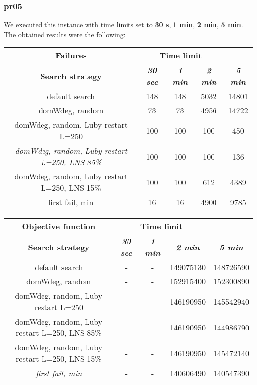 \subsubsection{pr05}
We executed this instance with time limits set to \textbf{30 s}, \textbf{1 min}, \textbf{2 min}, \textbf{5 min}.\\
The obtained results were the following:
{
\renewcommand{\arraystretch}{2}
\begin{longtable}[h]{| c | c | c | c | c |}
    \hline
    \textbf{Failures} & \multicolumn{3}{c}{Time limit} & \\
    \hline
    \textbf{Search strategy} & \textbf{\textit{30 sec}} & \textbf{\textit{1 min}} & \textbf{\textit{2 min}} & \textbf{\textit{5 min}} \\
    \hline
    \endhead
    default search                                         & 148 &  148 &  5032 &  14801 \\
    \hline
    domWdeg, random                                        &  73 &   73 &  4956 &  14722 \\
    \hline
    domWdeg, random, Luby restart L=250                    & 100 &  100 &   100 &    450 \\
    \hline
    \textit{domWdeg, random, Luby restart L=250, LNS 85\%} & 100 &  100 &   100 &    136 \\
    \hline
    domWdeg, random, Luby restart L=250, LNS 15\%          & 100 &  100 &   612 &   4389 \\
    \hline
    first fail, min                                        &  16 &   16 &  4900 &   9785 \\
    \hline
\end{longtable}
}

{
\renewcommand{\arraystretch}{2}
\begin{longtable}[h]{| c | c | c | c | c |}
    \hline
    \textbf{Objective function} & \multicolumn{3}{c}{Time limit} & \\
    \hline
    \textbf{Search strategy} & \textbf{\textit{30 sec}} & \textbf{\textit{1 min}} & \textbf{\textit{2 min}} & \textbf{\textit{5 min}} \\
    \hline
    \endhead
    default search                                        & - & - & 149075130 & 148726590 \\
    \hline
    domWdeg, random                                       & - & - & 152915400 & 152300890 \\
    \hline
    domWdeg, random, Luby restart L=250                   & - & - & 146190950 & 145542940 \\
    \hline
    domWdeg, random, Luby restart L=250, LNS 85\%         & - & - & 146190950 & 144986790 \\
    \hline
    domWdeg, random, Luby restart L=250, LNS 15\%         & - & - & 146190950 & 145472140 \\
    \hline
    \textit{first fail, min}                              & - & - & 140606490 & 140547390 \\
    \hline
\end{longtable}
}